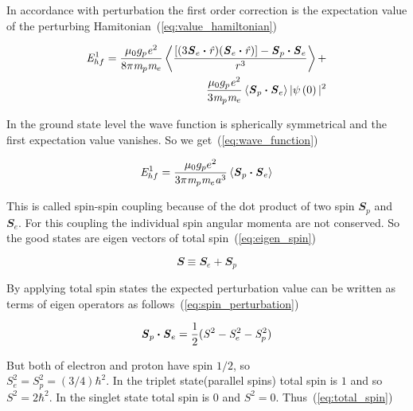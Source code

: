 \documentclass[fleqn,usenatbib]{mnras}
\begin{document}
In accordance with perturbation the first order correction is the expectation value of the perturbing Hamitonian~(\ref{eq:value_hamiltonian})

\begin{equation}
\begin{split}
 \mathit{E}_{hf}^{1}=\frac{\mathit{\umu}_{0}g_{p}\mathit{e}^{2}}{8\mathit{\upi}\mathit{m}_{p}\mathit{m}_{e}}\left\langle\frac{[(3\mathbfit{S}_{e}\bmath{\cdot}\mathit{\hat{r}})(\mathbfit{S}_{e}\bmath{\cdot}\mathit{\hat{r}})]-\mathbfit{S}_{p}\bmath{\cdot}\mathbfit{S}_{e}}{\mathit{r}^{3}}\right\rangle+\\\frac{\mathit{\umu}_{0}g_{p}\mathit{e}^{2}}{3\mathit{m}_{p}\mathit{m}_{e}}\left\langle\mathbfit{S}_{p}\bmath{\cdot}\mathbfit{S}_{e}\right\rangle\vert\mathit{\psi}\left(0\right)\vert^{2}
\end{split}
 \label{eq:value_hamiltonian} 
\end{equation}

In the ground state level the wave function is spherically symmetrical and the first expectation value vanishes. So we get~(\ref{eq:wave_function})

\begin{equation}
 \mathit{E}_{hf}^{1}=\frac{\mathit{\umu}_{0}g_{p}e^{2}}{3\upi\mathit{m}_{p}\mathit{m}_{e}\mathit{a}^{3}}\left\langle\mathbfit{S}_{p}\bmath{\cdot}\mathbfit{S}_{e}\right\rangle
 \label{eq:wave_function}
\end{equation}

This is called spin-spin coupling because of the dot product of two spin $\mathbfit{S}_{p}$ and $\mathbfit{S}_{e}$. For this coupling the individual spin angular momenta are not conserved. So the good states are eigen vectors of total spin~(\ref{eq:eigen_spin})

\begin{equation}
 \mathbfit{S}\equiv\mathbfit{S}_{e}+\mathbfit{S}_{p}
 \label{eq:eigen_spin}
\end{equation}

By applying total spin states the expected perturbation value can be written as terms of eigen operators as follows~(\ref{eq:spin_perturbation})

\begin{equation}
  \mathbfit{S}_{p}\bmath{\cdot}\mathbfit{S}_{e}=\frac{1}{2}(\mathit{S}^{2}-\mathit{S}_{e}^{2}-\mathit{S}_{p}^{2})
  \label{eq:spin_perturbation}
 \end{equation}
 
But both of electron and proton have spin $1/2$, so\\ $\mathit{S}_{e}^{2}=\mathit{S}_{p}^{2}=(3/4)\mathit{\hbar}^{2}$. In the triplet state(parallel spins) total spin is $1$ and so $\mathit{S}^{2}=2\mathit{\hbar}^{2}$. In the singlet state total spin is $0$ and $\mathit{S}^{2}=0$. Thus~(\ref{eq:total_spin})
\end{document}
